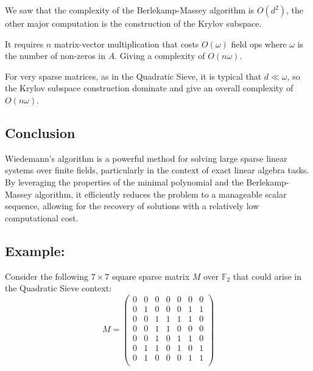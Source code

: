 \documentclass[a4paper, 11pt]{article}
\begin{document}
We saw that the complexity of the Berlekamp-Massey algorithm is $O(d^2)$, the other major computation is the construction of the Krylov subspace.

It requires $n$ matrix-vector multiplication that costs $O(\omega)$ field ops where $\omega$ is the number of non-zeros in $A$. Giving a complexity of $O(n\omega)$.

For very sparse matrices, as in the Quadratic Sieve, it is typical that $d \ll \omega$, so the Krylov subspace construction dominate and give an overall complexity of $O(n\omega)$.

\subsection{Conclusion}
Wiedemann's algorithm is a powerful method for solving large sparse linear systems over finite fields, particularly in the context of exact linear algebra tasks. By leveraging the properties of the minimal polynomial and the Berlekamp-Massey algorithm, it efficiently reduces the problem to a manageable scalar sequence, allowing for the recovery of solutions with a relatively low computational cost.

\subsection{Example:}

Consider the following $7 \times 7$ square sparse matrix $M$ over $\mathbb{F}_2$ that could arise in the Quadratic Sieve context:
\begin{equation}
    M = \begin{pmatrix}
        0 & 0 & 0 & 0 & 0 & 0 & 0 \\
        0 & 1 & 0 & 0 & 0 & 1 & 1 \\
        0 & 0 & 1 & 1 & 1 & 1 & 0 \\
        0 & 0 & 1 & 1 & 0 & 0 & 0 \\
        0 & 0 & 1 & 0 & 1 & 1 & 0 \\
        0 & 1 & 1 & 0 & 1 & 0 & 1 \\
        0 & 1 & 0 & 0 & 0 & 1 & 1 \\
    \end{pmatrix}
\end{equation}
\end{document}
